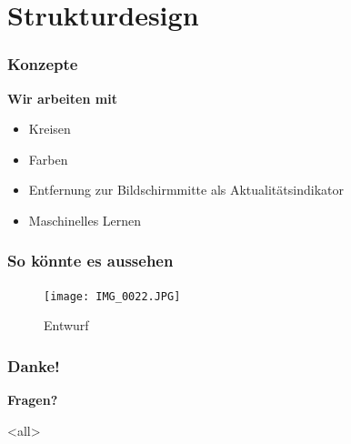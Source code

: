\section{Strukturdesign}
\label{strukturdesign}

\begin{frame}

\frametitle{Konzepte}
\label{konzepte}

\textbf{Wir arbeiten mit}

\begin{itemize}
\item Kreisen

\item Farben

\item Entfernung zur Bildschirmmitte als Aktualitätsindikator

\item Maschinelles Lernen

\end{itemize}

\end{frame}

\begin{frame}

\frametitle{So könnte es aussehen}
\label{soknnteesaussehen}

\begin{figure}[htbp]
\centering
\texttt{[image: IMG\_0022.JPG]}
\caption{Entwurf}
\label{}
\end{figure}


\end{frame}

\begin{frame}

\frametitle{Danke!}
\label{danke}

\textbf{Fragen?}

\end{frame}

\mode<all>


\mode*

